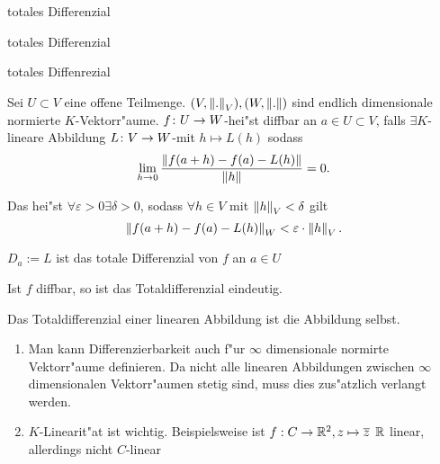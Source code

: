 \documentclass[class=article, crop=false]{standalone}
\begin{document}
\begin{zettel}{totales Differenzial}
\begin{flashcard}[o5zy7w6j]{totales Differenzial}
	\begin{question}
		totales Diffenrezial
	\end{question}
	\begin{definition}
		Sei $U \subset  V$ eine offene Teilmenge. $(V,\left\|.\right\|_V), (W,\left\|.\right\|)$ sind endlich dimensionale normierte $K$-Vektorr"aume. $f \colon U\to W$-hei"st diffbar an $a \in  U \subset  V$, falls $\exists  K$-lineare Abbildung $L \colon V\to W$-mit $h \mapsto L (h)$ sodass
		\[
			\lim_{h \to 0} \frac{ \left\|f (a+h)- f (a)- L (h)\right\|}{ \left\|h\right\|} =0
		.\]

		Das hei"st $\forall\varepsilon>0 \exists\delta>0$, sodass $\forall h \in V$ mit $\left\|h\right\|_V < \delta$ gilt
		\[
			\left\| f (a +h) - f (a)- L (h)\right\|_W < \varepsilon \cdot  \left\|h\right\|_V
		.\]

		$D_a := L $ ist das totale Differenzial von $f$  an $a \in  U$
	\end{definition}
\end{flashcard}

\begin{remark}
	Ist $f$ diffbar, so ist das Totaldifferenzial eindeutig.
\end{remark}

\begin{remark}
	Das Totaldifferenzial einer linearen Abbildung ist die Abbildung selbst.
\end{remark}

\begin{remark}
	\begin{enumerate}
		\item Man kann Differenzierbarkeit auch f"ur $\infty$ dimensionale normirte Vektorr"aume definieren. Da nicht alle linearen Abbildungen zwischen $\infty$ dimensionalen Vektorr"aumen stetig sind, muss dies zus"atzlich verlangt werden.
		\item $K$-Linearit"at ist wichtig. Beispielsweise ist $f: C \to \mathbb{R}^2, z \mapsto \overline{z}$ $\mathbb{R} $ linear, allerdings nicht $C $-linear
	\end{enumerate}
\end{remark}

\end{zettel}
\end{document}
